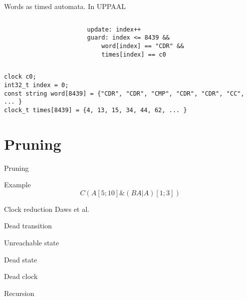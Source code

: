 \begin{frame}[fragile]{Words as timed automata.}
    In UPPAAL
    \begin{columns}
        \begin{column}{0.5\textwidth}
            

        \end{column}
        \begin{column}{0.5\textwidth}
            \begin{lstlisting}[basicstyle=\tiny]
update: index++
guard: index <= 8439 &&
    word[index] == "CDR" &&
    times[index] == c0
            \end{lstlisting}
        \end{column}
    \end{columns}
    \begin{lstlisting}[basicstyle=\tiny]
clock c0;
int32_t index = 0;
const string word[8439] = {"CDR", "CDR", "CMP", "CDR", "CDR", "CC", ... }
clock_t times[8439] = {4, 13, 15, 34, 44, 62, ... }
    \end{lstlisting}
\end{frame}

\section{Pruning}
\begin{frame}[shrink=5]{Pruning}
    \begin{center}
        
    \end{center}
\end{frame}
\begin{frame}{Example}
    $$C(A[5;10]\&(BA|A)[1;3])$$
    
\end{frame}
\begin{frame}{Clock reduction}
    Daws et al.
    
\end{frame}
\begin{frame}{Dead transition}
    
    
\end{frame}
\begin{frame}{Unreachable state}
    
    
\end{frame}
\begin{frame}{Dead state}
    
    
\end{frame}
\begin{frame}{Dead clock}
    
    
\end{frame}
\begin{frame}{Recursion}
    
    
\end{frame}


